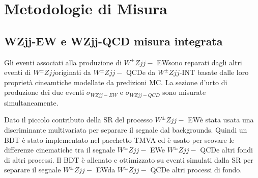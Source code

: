 \documentclass[11pt]{article}
\newcommand{\wzjjew}{$W^\pm Z jj-$ EW}
\newcommand{\wzjjqcd}{$W^\pm Z jj-$ QCD}
\newcommand{\wzjj}{$W^\pm Z jj$}
\begin{document}
\section{Metodologie di Misura}
\subsection{WZjj-EW e WZjj-QCD misura integrata}
Gli eventi associati alla produzione di \wzjjew sono reparati dagli altri eventi di \wzjj originati da \wzjjqcd e da \wzjj-INT basate dalle loro proprietà cineamtiche modellate da predizioni MC. La sezione d'urto di produzione dei due eventi $\sigma_{WZjj-EW}$ e $\sigma_{WZjj-QCD}$ sono misurate simultaneamente.

Dato il piccolo contributo della SR del processo \wzjjew è stata usata una discriminante multivariata  per separare il segnale dal backgrounds. Quindi un BDT è stato implementato nel pacchetto TMVA ed è usato per scovare le differenze cinematiche tra il segnale \wzjjew e \wzjjqcd e altri fondi di altri processi. Il BDT è allenato e ottimizzato su eventi simulati dalla SR per separare il segnale \wzjjew da \wzjjqcd e altri processi di fondo.
\end{document}
